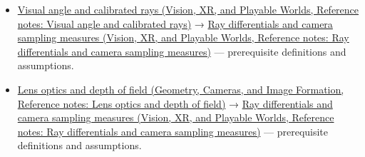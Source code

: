 \begin{itemize}
\item
  \href{../07-Vision-XR-and-Playable-Worlds/main.pdf\#nameddest=appendix-7d356c396d1a}{Visual angle and calibrated rays (Vision, XR, and Playable Worlds, Reference notes: Visual angle and calibrated rays)} → \href{../07-Vision-XR-and-Playable-Worlds/main.pdf\#nameddest=appendix-8c40fad29462}{Ray differentials and camera sampling measures (Vision, XR, and Playable Worlds, Reference notes: Ray differentials and camera sampling measures)} --- prerequisite definitions and assumptions.
\item
  \href{../03-Geometry-Cameras-and-Image-Formation/main.pdf\#nameddest=appendix-21f8456e2629}{Lens optics and depth of field (Geometry, Cameras, and Image Formation, Reference notes: Lens optics and depth of field)} → \href{../07-Vision-XR-and-Playable-Worlds/main.pdf\#nameddest=appendix-8c40fad29462}{Ray differentials and camera sampling measures (Vision, XR, and Playable Worlds, Reference notes: Ray differentials and camera sampling measures)} --- prerequisite definitions and assumptions.
\end{itemize}
